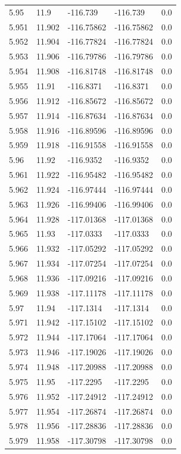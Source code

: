 \begin{tabular}{lllll}
5.95 & 11.9 & -116.739 & -116.739 & 0.0 \\
5.951 & 11.902 & -116.75862 & -116.75862 & 0.0 \\
5.952 & 11.904 & -116.77824 & -116.77824 & 0.0 \\
5.953 & 11.906 & -116.79786 & -116.79786 & 0.0 \\
5.954 & 11.908 & -116.81748 & -116.81748 & 0.0 \\
5.955 & 11.91 & -116.8371 & -116.8371 & 0.0 \\
5.956 & 11.912 & -116.85672 & -116.85672 & 0.0 \\
5.957 & 11.914 & -116.87634 & -116.87634 & 0.0 \\
5.958 & 11.916 & -116.89596 & -116.89596 & 0.0 \\
5.959 & 11.918 & -116.91558 & -116.91558 & 0.0 \\
5.96 & 11.92 & -116.9352 & -116.9352 & 0.0 \\
5.961 & 11.922 & -116.95482 & -116.95482 & 0.0 \\
5.962 & 11.924 & -116.97444 & -116.97444 & 0.0 \\
5.963 & 11.926 & -116.99406 & -116.99406 & 0.0 \\
5.964 & 11.928 & -117.01368 & -117.01368 & 0.0 \\
5.965 & 11.93 & -117.0333 & -117.0333 & 0.0 \\
5.966 & 11.932 & -117.05292 & -117.05292 & 0.0 \\
5.967 & 11.934 & -117.07254 & -117.07254 & 0.0 \\
5.968 & 11.936 & -117.09216 & -117.09216 & 0.0 \\
5.969 & 11.938 & -117.11178 & -117.11178 & 0.0 \\
5.97 & 11.94 & -117.1314 & -117.1314 & 0.0 \\
5.971 & 11.942 & -117.15102 & -117.15102 & 0.0 \\
5.972 & 11.944 & -117.17064 & -117.17064 & 0.0 \\
5.973 & 11.946 & -117.19026 & -117.19026 & 0.0 \\
5.974 & 11.948 & -117.20988 & -117.20988 & 0.0 \\
5.975 & 11.95 & -117.2295 & -117.2295 & 0.0 \\
5.976 & 11.952 & -117.24912 & -117.24912 & 0.0 \\
5.977 & 11.954 & -117.26874 & -117.26874 & 0.0 \\
5.978 & 11.956 & -117.28836 & -117.28836 & 0.0 \\
5.979 & 11.958 & -117.30798 & -117.30798 & 0.0 \\

\end{tabular}
